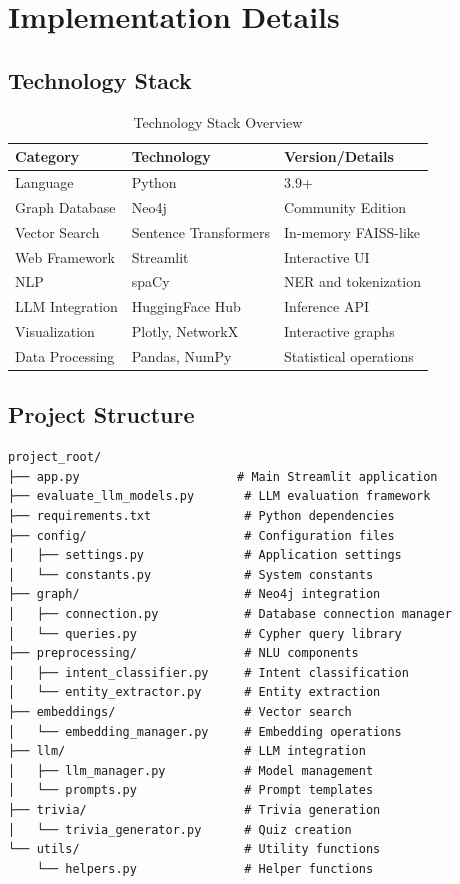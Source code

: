 \documentclass[11pt, a4paper]{article}
\begin{document}
\section{Implementation Details}
\label{sec:implementation}

\subsection{Technology Stack}

\begin{table}[H]
\centering
\caption{Technology Stack Overview}
\label{tab:tech_stack}
\begin{tabular}{@{}lll@{}}
\toprule
\textbf{Category} & \textbf{Technology} & \textbf{Version/Details} \\
\midrule
Language & Python & 3.9+ \\
Graph Database & Neo4j & Community Edition \\
Vector Search & Sentence Transformers & In-memory FAISS-like \\
Web Framework & Streamlit & Interactive UI \\
NLP & spaCy & NER and tokenization \\
LLM Integration & HuggingFace Hub & Inference API \\
Visualization & Plotly, NetworkX & Interactive graphs \\
Data Processing & Pandas, NumPy & Statistical operations \\
\bottomrule
\end{tabular}
\end{table}

\subsection{Project Structure}

\begin{verbatim}
project_root/
├── app.py                      # Main Streamlit application
├── evaluate_llm_models.py       # LLM evaluation framework
├── requirements.txt             # Python dependencies
├── config/                      # Configuration files
│   ├── settings.py              # Application settings
│   └── constants.py             # System constants
├── graph/                       # Neo4j integration
│   ├── connection.py            # Database connection manager
│   └── queries.py               # Cypher query library
├── preprocessing/               # NLU components
│   ├── intent_classifier.py     # Intent classification
│   └── entity_extractor.py      # Entity extraction
├── embeddings/                  # Vector search
│   └── embedding_manager.py     # Embedding operations
├── llm/                         # LLM integration
│   ├── llm_manager.py           # Model management
│   └── prompts.py               # Prompt templates
├── trivia/                      # Trivia generation
│   └── trivia_generator.py      # Quiz creation
└── utils/                       # Utility functions
    └── helpers.py               # Helper functions
\end{verbatim}
\end{document}
